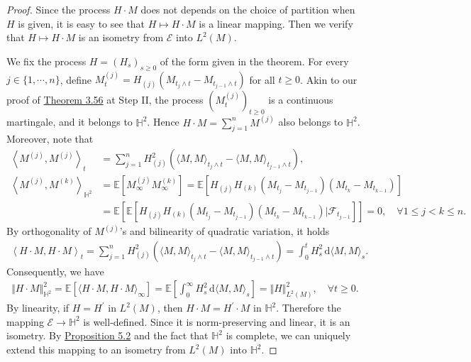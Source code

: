 \documentclass{article}
\numberwithin{equation}{section}
\newcommand{\E}{\mathbb{E}}
\renewcommand{\d}{\mathrm{d}}
\theoremstyle{plain}
\theoremstyle{definition}
\begin{document}
\begin{proof}
Since the process $H\cdot M$ does not depends on the choice of partition when $H$ is given, it is easy to see that $H\mapsto H\cdot M$ is a linear mapping. Then we verify that $H\mapsto H\cdot M$ is an isometry from $\mathscr{E}$ into $L^2(M)$.

We fix the process $H=(H_s)_{s\geq 0}$ of the form given in the theorem. For every $j\in\{1,\cdots,n\}$, define $M_t^{(j)}=H_{(j)}(M_{t_j\wedge t}-M_{t_{j-1}\wedge t})$ for all $t\geq 0$. Akin to our proof of \hyperref[thm:3.56]{Theorem 3.56} at Step II, the process $(M_t^{(j)})_{t\geq 0}$ is a continuous martingale, and it belongs to $\mathbb{H}^2$. Hence $H\cdot M=\sum_{j=1}^n M^{(j)}$ also belongs to $\mathbb{H}^2$. Moreover, note that
\begin{align*}
	\left\langle M^{(j)},M^{(j)}\right\rangle_t &=\sum_{j=1}^n H_{(j)}^2\left(\langle M,M\rangle_{t_j\wedge t}-\langle M,M\rangle_{t_{j-1}\wedge t}\right),\tag{By the approximation formula}\\
	\left\langle M^{(j)},M^{(k)}\right\rangle_{\mathbb{H}^2} &= \E\left[M_\infty^{(j)}M_\infty^{(k)}\right] = \E\left[H_{(j)}H_{(k)}(M_{t_j}-M_{t_{j-1}})(M_{t_k}-M_{t_{k-1}})\right]\\
	&= \E\left[\E\left[H_{(j)}H_{(k)}(M_{t_j}-M_{t_{j-1}})(M_{t_k}-M_{t_{k-1}})|\mathscr{F}_{t_{j-1}}\right]\right] = 0,\quad \forall 1\leq j<k\leq n.
\end{align*}
By orthogonality of $M^{(j)}$'s and bilinearity of quadratic variation, it holds
\begin{align*}
	\left\langle H\cdot M,H\cdot M\right\rangle_t = \sum_{j=1}^n H_{(j)}^2\left(\langle M,M\rangle_{t_j\wedge t} -\langle M,M\rangle_{t_{j-1}\wedge t}\right) = \int_0^t H_s^2\,\d \langle M,M\rangle_s.
\end{align*}
Consequently, we have
\begin{align*}
	\Vert H\cdot M\Vert_{\mathbb{H}^2}^2=\E\left[\langle H\cdot M,H\cdot M\rangle_\infty\right] = \E\left[\int_0^\infty H_s^2\,\d \langle M,M\rangle_s\right] = \Vert H\Vert_{L^2(M)}^2,\quad \forall t\geq 0.
\end{align*}
By linearity, if $H=H^\prime$ in $L^2(M)$, then $H\cdot M=H^\prime\cdot M$ in $\mathbb{H}^2$. Therefore the mapping $\mathscr{E}\to\mathbb{H}^2$ is well-defined. Since it is norm-preserving and linear, it is an isometry. By \hyperref[prop:5.2]{Proposition 5.2} and the fact that $\mathbb{H}^2$ is complete, we can uniquely extend this mapping to an isometry from $L^2(M)$ into $\mathbb{H}^2$.


\end{proof}
\end{document}
